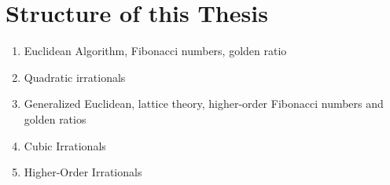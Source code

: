 \section{Structure of this Thesis}

\begin{enumerate}
  \item Euclidean Algorithm, Fibonacci numbers, golden ratio
  \item Quadratic irrationals
  \item Generalized Euclidean, lattice theory, higher-order Fibonacci numbers and golden ratios
  \item Cubic Irrationals
  \item Higher-Order Irrationals
\end{enumerate}
